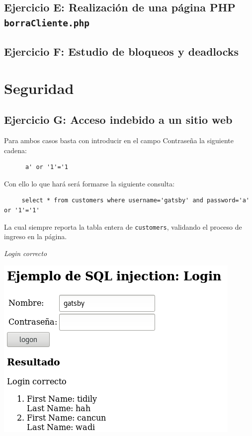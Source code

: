 \documentclass{article}
\begin{document}
\subsection{Ejercicio E: {\small Realización de una página PHP \texttt{borraCliente.php}}}
\subsection{Ejercicio F: {\small Estudio de bloqueos y deadlocks}}
\section{Seguridad}
\subsection{Ejercicio G: {\small Acceso indebido a un sitio web}}
Para ambos casos basta con introducir en el campo Contraseña la siguiente cadena:
\begin{lstlisting}
      a' or '1'='1
\end{lstlisting}
Con ello lo que hará será formarse la siguiente consulta:
\begin{lstlisting}
     select * from customers where username='gatsby' and password='a' or '1'='1' 
\end{lstlisting}
La cual siempre reporta la tabla entera de \texttt{customers}, validando el proceso de ingreso en la página.

        \begin{minipage}{\linewidth}
            \centering
            \captionsetup{type=figure}
            \caption{\textit{Login correcto}}
            \label{fig:fig1}
            \includegraphics[scale=0.3]{img/sql_inject1}
        \end{minipage}
\end{document}
